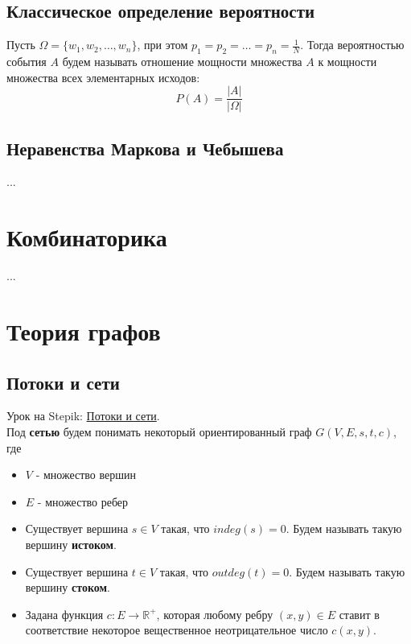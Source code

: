 \documentclass{article}
\begin{document}
\subsection{Классическое определение вероятности}

Пусть $\Omega = \{w_1, w_2, \dots, w_n\}$, при этом $p_1 = p_2 = \dots = p_n = \frac{1}{N}$. Тогда вероятностью события $A$ будем называть отношение мощности множества $A$ к мощности множества всех элементарных исходов: $$ P(A) = \frac{|A|}{|\Omega|} $$

\subsection{Неравенства Маркова и Чебышева}

...

\section{Комбинаторика}

...

\section{Теория графов}

\subsection{Потоки и сети}

Урок на Stepik: \href{https://stepik.org/lesson/36127/step/10?unit=44097}{Потоки и сети}. \\

Под \textbf{сетью} будем понимать некоторый ориентированный граф $G(V, E, s, t, c)$, где

\begin{itemize}
	\item $V$ - множество вершин
	\item $E$ - множество ребер
	\item Существует вершина $s \in V$ такая, что $indeg(s) = 0$. Будем называть такую вершину \textbf{истоком}.
	\item Существует вершина $t \in V$ такая, что $outdeg(t) = 0$. Будем называть такую вершину \textbf{стоком}.
	\item Задана функция $c: E \to \mathbb{R^+}$, которая любому ребру $(x, y) \in E$ ставит в соответствие некоторое вещественное неотрицательное число $c(x, y)$. 
\end{itemize}
\end{document}
